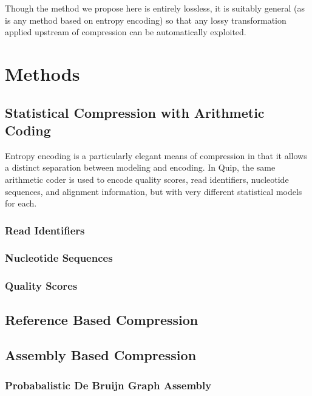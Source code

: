 \documentclass[twocolumn]{article}
\begin{document}

Though the method we propose here is entirely lossless, it is suitably general
(as is any method based on entropy encoding) so that any lossy transformation
applied upstream of compression can be automatically exploited.


\section{Methods}

\subsection{Statistical Compression with Arithmetic Coding}

Entropy encoding is a particularly elegant means of compression in that it
allows a distinct separation between modeling and encoding. In Quip, the same
arithmetic coder is used to encode quality scores, read identifiers,
nucleotide sequences, and alignment information, but with very different
statistical models for each.

\subsubsection{Read Identifiers}

\subsubsection{Nucleotide Sequences}

\subsubsection{Quality Scores}


\subsection{Reference Based Compression}

\subsection{Assembly Based Compression}



\subsubsection{Probabalistic De Bruijn Graph Assembly}
\end{document}
